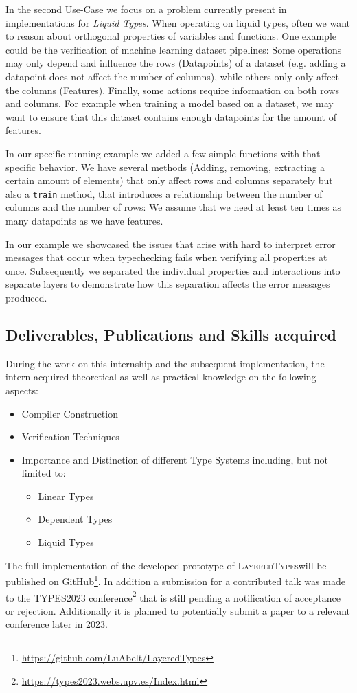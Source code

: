 \documentclass{easychair}
\newcommand{\LayeredTypes}{\textsc{LayeredTypes}}
\begin{document}
In the second Use-Case we focus on a problem currently present in implementations for \textit{Liquid Types}. When operating on liquid types, often we want to reason about orthogonal properties of variables and functions. One example could be the verification of machine learning dataset pipelines: Some operations may only depend and influence the rows (Datapoints) of a dataset (e.g. adding a datapoint does not affect the number of columns), while others only only affect the columns (Features). Finally, some actions require information on both rows and columns. For example when training a model based on a dataset, we may want to ensure that this dataset contains enough datapoints for the amount of features.

In our specific running example we added a few simple functions with that specific behavior. We have several methods (Adding, removing, extracting a certain amount of elements) that only affect rows and columns separately but also a \texttt{train} method, that introduces a relationship between the number of columns and the number of rows: We assume that we need at least ten times as many datapoints as we have features.

In our example we showcased the issues that arise with hard to interpret error messages that occur when typechecking fails when verifying all properties at once. Subsequently we separated the individual properties and interactions into separate layers to demonstrate how this separation affects the error messages produced.

\subsection{Deliverables, Publications and Skills acquired}

During the work on this internship and the subsequent implementation, the intern acquired theoretical as well as practical knowledge on the following aspects:
\begin{itemize}
	\item Compiler Construction
	\item Verification Techniques
	\item Importance and Distinction of different Type Systems including, but not limited to:
		\begin{itemize}
			\item Linear Types
			\item Dependent Types
			\item Liquid Types
		\end{itemize}
\end{itemize}

The full implementation of the developed prototype of \LayeredTypes will be published on GitHub\footnote{\url{https://github.com/LuAbelt/LayeredTypes}}. In addition a submission for a contributed talk was made to the TYPES2023 conference\footnote{\url{https://types2023.webs.upv.es/Index.html}} that is still pending a notification of acceptance or rejection. Additionally it is planned to potentially submit a paper to a relevant conference later in 2023.





\end{document}
